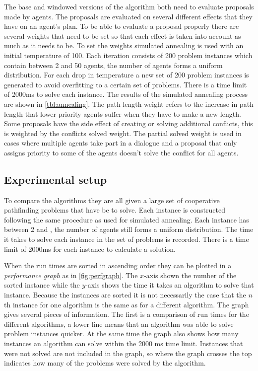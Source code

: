 The base and windowed versions of the algorithm both need to evaluate proposals
made by agents. The proposals are evaluated on several different effects that
they have on an agent's plan. To be able to evaluate a proposal properly there
are several weights that need to be set so that each effect is taken into
account as much as it needs to be. To set the weights simulated annealing
\cite{kirkpatrick1983} is used with an initial temperature of 100. Each
iteration consists of 200 problem instances which contain between 2 and 50
agents, the number of agents forms a uniform distribution. For each drop in
temperature a new set of 200 problem instances is generated to avoid
overfitting to a certain set of problems. There is a time limit of 2000ms to
solve each instance. The results of the simulated
annealing process are shown in \autoref{tbl:annealing}. The path length weight
refers to the increase in path length that lower priority agents suffer when
they have to make a new length. Some proposals have the side effect of creating
or solving additional conflicts, this is weighted by the conflicts solved
weight. The partial solved weight is used in cases where multiple agents take
part in a dialogue and a proposal that only assigns priority to some of the
agents doesn't solve the conflict for all agents.

\subsection{Experimental setup}
To compare the algorithms they are all given a large set of cooperative
pathfinding problems that have be to solve. Each instance is constructed
following the same procedure as used for simulated annealing. Each instance has
between 2 and \agentsupb, the number of agents still forms a uniform
distribution. The time it takes to solve each instance in the set of problems
is recorded. There is a time limit of 2000ms for each instance to calculate a
solution.

When the run times are sorted in ascending order they can be plotted
in a \emph{performance graph} as in \autoref{fig:perfgraph}. The $x$-axis shown
the number of the sorted instance while the $y$-axis shows the time it takes an
algorithm to solve that instance. Because the instances are sorted it is not
necessarily the case that the $n$th instance for one algorithm is the same as
for a different algorithm. The graph gives several pieces of information. The
first is a comparison of run times for the different algorithms, a lower line
means that an algorithm was able to solve problem instances quicker. At the
same time the graph also shows how many instances an algorithm can solve within
the 2000 ms time limit. Instances that were not solved are not included in the
graph, so where the graph crosses the top indicates how many of the problems
were solved by the algorithm.

